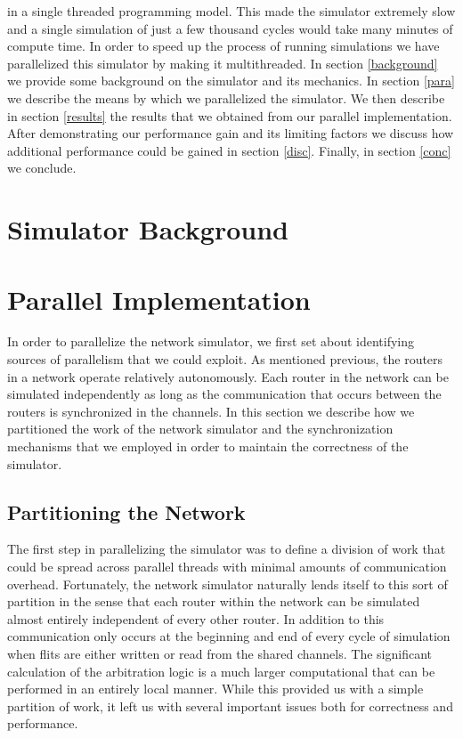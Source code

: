 \documentclass{article}
\begin{document}
\begin{multicols}{2}
in a single threaded programming model.  This made the simulator extremely
slow and a single simulation of just a few thousand cycles would take many
minutes of compute time.  In order to speed up the process of running
simulations we have parallelized this simulator by making it
multithreaded.  In section \ref{background} we provide some background on
the simulator and its mechanics.  In section \ref{para} we describe the
means by which we parallelized the simulator.  We then describe in section
\ref{results} the results that we obtained from our parallel
implementation.  After demonstrating our performance gain and its limiting
factors we discuss how additional performance could be gained in section
\ref{disc}.  Finally, in section \ref{conc} we conclude.

\section{Simulator Background \label{background}}


\section{Parallel Implementation \label{para}}
In order to parallelize the network simulator, we first set about
identifying sources of parallelism that we could exploit.  As mentioned previous, the routers in a network operate relatively autonomously.   Each router in the network can be simulated
independently as long as the communication that occurs between the routers
is synchronized in the channels.  In this section we describe how we
partitioned the work of the network simulator and the synchronization
mechanisms that we employed in order to maintain the correctness of the simulator.

\subsection{Partitioning the Network}
The first step in parallelizing the simulator was to define a division of
work that could be spread across parallel threads with minimal amounts of
communication overhead.  Fortunately, the network simulator naturally
lends itself to this sort of partition in the sense that each router
within the network can be simulated almost entirely independent of every
other router.  In addition to this communication only occurs at the
beginning and end of every cycle of simulation when flits are either
written or read from the shared channels.  The significant
calculation of the arbitration logic is a much larger computational that
can be performed in an entirely local manner.  While this provided us with
a simple partition of work, it left us with several important issues both
for correctness and performance.


\end{multicols}
\end{document}
